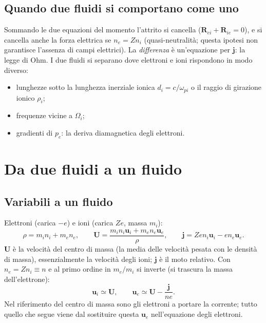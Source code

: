 \subsection{Quando due fluidi si comportano come uno}
Sommando le due equazioni del momento l'attrito si cancella ($\mathbf{R}_{ei}+\mathbf{R}_{ie}=0$), e si cancella anche la forza elettrica se $n_e=Zn_i$ (quasi-neutralità; questa ipotesi non garantisce l'assenza di campi elettrici). La \emph{differenza} è un'equazione per $\mathbf{j}$: la legge di Ohm. I due fluidi si separano dove elettroni e ioni rispondono in modo diverso:
\begin{itemize}
\item lunghezze sotto la lunghezza inerziale ionica $d_i=c/\omega_{pi}$ o il raggio di girazione ionico $\rho_i$;
\item frequenze vicine a $\Omega_i$;
\item gradienti di $p_e$: la deriva diamagnetica degli elettroni.
\end{itemize}

\section{Da due fluidi a un fluido}

\subsection{Variabili a un fluido}
Elettroni (carica $-e$) e ioni (carica $Ze$, massa $m_i$):
\begin{equation}
\rho=m_in_i+m_en_e,\qquad\mathbf{U}=\frac{m_in_i\mathbf{u}_i+m_en_e\mathbf{u}_e}{\rho},\qquad\mathbf{j}=Zen_i\mathbf{u}_i-en_e\mathbf{u}_e .
\end{equation}
$\mathbf{U}$ è la velocità del centro di massa (la media delle velocità pesata con le densità di massa), essenzialmente la velocità degli ioni; $\mathbf{j}$ è il moto relativo. Con $n_e=Zn_i\equiv n$ e al primo ordine in $m_e/m_i$ si inverte (si trascura la massa dell'elettrone):
\begin{equation}
\mathbf{u}_i\simeq\mathbf{U},\qquad\mathbf{u}_e\simeq\mathbf{U}-\frac{\mathbf{j}}{ne}.
\end{equation}
Nel riferimento del centro di massa sono gli elettroni a portare la corrente; tutto quello che segue viene dal sostituire questa $\mathbf{u}_e$ nell'equazione degli elettroni.

